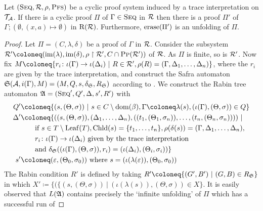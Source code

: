 \begin{theorem}[Completeness]\label{lem:complete}
  Let $(\textsc{Seq}, \mathcal{R}, \rho, \textsc{Pfs})$ be a cyclic proof system induced by a trace
  interpretation on $\mathcal{T}_{\mathcal{A}}$. If there is a cyclic proof $\Pi$ of $\Gamma \in \textsc{Seq}$
  in $\mathcal{R}$ then there is a proof $\Pi'$ of $\Gamma ; (\emptyset, (x, a) \mapsto
  \emptyset)$ in $\mathrm{R}(\mathcal{R})$. Furthermore, $\mathrm{erase}(\Pi')$ is an unfolding of $\Pi$.
\end{theorem}
\begin{proof}
  Let $\Pi = (C, \lambda, \delta)$ be a proof of $\Gamma$ in $\mathcal{R}$. Consider the
  subsystem $\RR' \coloneq (\im(\lambda), \im(\delta), \rho \uh \RR', C \cap
  \Pp(\RR'))$ of $\mathcal{R}$. As $\Pi$ is finite, so is $\mathcal{R}'$. Now fix
  \(M \coloneq \{r_i \colon \iota(\Gamma) \to \iota(\Delta_i) ~|~ R \in \RR', \rho(R)
    = (\Gamma, \Delta_1, \ldots, \Delta_n) \}\), where the $r_i$ are given by the trace interpretation,
  and construct the Safra automaton $\mathfrak{S}(\mathcal{A}, i(\Gamma), M) = (M, Q, s,
  \delta_{\mathfrak{S}}, R_{\mathfrak{S}})$ according to .
  We construct the Rabin tree automaton $\mathfrak{A} = (\textsc{Seq}', Q', \Delta, s', R')$ with
  \begin{align*}
    Q' & \coloneq \{(s, (\Theta, \sigma)) ~|~ s \in C \setminus \dom(\beta), \Gamma \coloneq \lambda(s), (\iota(\Gamma), (\Theta, \sigma)) \in Q\} \\
    \Delta' & \coloneq \{((s, (\Theta, \sigma)), (\Delta_1, \ldots, \Delta_n), ((t_1, (\Theta_1, \sigma_n)), \ldots, (t_n, (\Theta_n, \sigma_n)))) ~|~ \\
       & \qquad \text{if } s \in T \setminus \Leaf(T), \Chld(s) = \{t_1, \ldots, t_n\}, \rho(\delta(s)) = (\Gamma, \Delta_1, \ldots, \Delta_n), \\
       & \qquad r_i \colon \iota(\Gamma) \to \iota(\Delta_i) \text{ given by the trace interpretation } \\
       & \qquad \text{and } \delta_{\SSB}((\iota(\Gamma), (\Theta, \sigma)), r_i) = (\iota(\Delta_i), (\Theta_i, \sigma_i))\} \\
    s' & \coloneq (\varepsilon, (\Theta_0, \sigma_0)) \text{ where } s = (\iota(\lambda(\varepsilon)), (\Theta_0, \sigma_0))
  \end{align*}
  The Rabin condition $R'$ is defined by taking $R' \coloneq
  \{(G', B') ~|~ (G, B) \in R_{\SSB}\}$ in which $X' \coloneq \{(\{(s, (\Theta,
  \sigma)) ~|~ (\iota(\lambda(s)), (\Theta, \sigma)) \in X\}$.
  It is easily observed that $L(\mathfrak{A})$ contains precisely the `infinite unfolding' of $\Pi$
  which has a successful run of

\end{proof}
